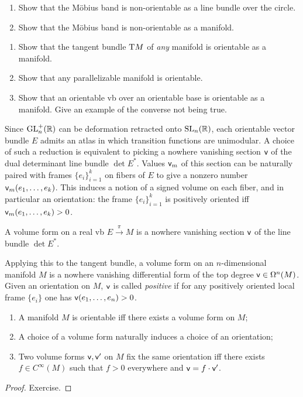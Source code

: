 \begin{xca}
\begin{enumerate}
    \item Show that the M\"obius band is non-orientable as a line bundle over the circle.
    \item Show that the M\"obius band is non-orientable as a manifold.
\end{enumerate}
\end{xca}

\begin{xca}
\begin{enumerate}
    \item Show that the tangent bundle $\mathrm{T} M$ of \emph{any} manifold is orientable as a manifold.
    \item Show that any parallelizable manifold is orientable.
    \item Show that an orientable \gls{vb} over an orientable base is orientable as a manifold. Give an example of the converse not being true.
\end{enumerate}
\end{xca}

Since $\operatorname{GL}^+_n(\mathbb{R})$ can be deformation retracted onto $\operatorname{SL}_n(\mathbb{R})$, each orientable vector bundle $E$ admits an atlas in which transition functions are unimodular. A choice of such a reduction is equivalent to picking a nowhere vanishing section $\mathsf{v}$ of the dual determinant line bundle $\det E^\ast$. Values $\mathsf{v}_m$ of this section can be naturally paired with frames $\{e_i\}_{i=1}^k$ on fibers of $E$ to give a nonzero number $\mathsf{v}_m(e_1,\ldots,e_k)$. This induces a notion of a signed volume on each fiber, and in particular an orientation: the frame $\{e_i\}_{i=1}^k$ is positively oriented iff $\mathsf{v}_m(e_1,\ldots,e_k)>0$.

\begin{defn}
    A volume form on a real \gls{vb} $E\overset{\pi}{\to} M$ is a nowhere vanishing section $\mathsf{v}$ of the line bundle $\det E^\ast$. 

    Applying this to the tangent bundle, a volume form on an $n$-dimensional manifold $M$ is a nowhere vanishing differential form of the top degree $\mathsf{v}\in \Omega^n(M)$. Given an orientation on $M$, $\mathsf{v}$ is called \emph{positive} if for any positively oriented local frame $\{e_i\}$ one has $\mathsf{v}(e_1,\ldots,e_n)>0$.
\end{defn}

\begin{prop}
\begin{enumerate}
    \item A manifold $M$ is orientable iff there exists a volume form on $M$;
    \item A choice of a volume form naturally induces a choice of an orientation;
    \item Two volume forms $\mathsf{v},\mathsf{v}'$ on $M$ fix the same orientation iff there exists $f\in C^\infty(M)$ such that $f>0$ everywhere and $\mathsf{v}=f\cdot \mathsf{v}'$. 
\end{enumerate}
\end{prop}
\begin{proof}
Exercise.
\end{proof}


